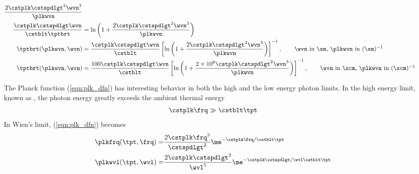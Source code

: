 \documentclass[12pt]{article}
\begin{document}
\begin{subequations}
\begin{align}
\frac{2 \cstplk \cstspdlgt^{2} \wvn^{3}}{\plkwvn} \nonumber \\
\frac{\cstplk \cstspdlgt \wvn}{\cstblt \tptbrt} & =
\ln \left( 1 + \frac{2 \cstplk \cstspdlgt^{2} \wvn^{3}}{\plkwvn} \right) \nonumber \\
\tptbrt(\plkwvn,\wvn) & = \frac{\cstplk \cstspdlgt \wvn}{\cstblt}
\left[ \ln \left( 1 + \frac{2 \cstplk \cstspdlgt^{2} \wvn^{3}}{\plkwvn} \right) \right]^{-1},
\qquad \mbox{\wvn\ in \xm, \plkwvn\ in (\xm)$^{-1}$} \\
\label{eqn:tpt_brt_wvn_cgs_dfn}
\tptbrt(\plkwvn,\wvn) & = \frac{100 \cstplk \cstspdlgt \wvn}{\cstblt}
\left[ \ln \left( 1 + \frac{2 \times 10^{8} \cstplk \cstspdlgt^{2} \wvn^{3}}{\plkwvn} \right) \right]^{-1},
\qquad \mbox{\wvn\ in \xcm, \plkwvn\ in (\xcm)$^{-1}$}
\end{align}
\end{subequations}

The Planck function (\ref{eqn:plk_dfn}) has interesting behavior in
both the high and the low energy photon limits. 
In the high energy limit, known as ,
the photon energy greatly exceeds the ambient thermal energy
\begin{eqnarray}
\cstplk \frq \gg \cstblt \tpt
\label{eqn:wien_dfn}
\end{eqnarray}
In Wien's limit, (\ref{eqn:plk_dfn}) becomes
\begin{subequations}
\label{eqn:plk_wien_dfn}
\begin{align}
\label{eqn:plk_frq_wien_dfn}
\plkfrq(\tpt,\frq) = & \frac{2 \cstplk \frq^{3}}{\cstspdlgt^{2}}
\me^{-\cstplk \frq / \cstblt \tpt} \\
\label{eqn:plk_wvl_wien_dfn}
\plkwvl(\tpt,\wvl) = & \frac{2 \cstplk \cstspdlgt^{2}}{\wvl^{5}} 
\me^{-\cstplk \cstspdlgt / \wvl \cstblt \tpt}
\end{align}
\end{subequations}
\end{document}
